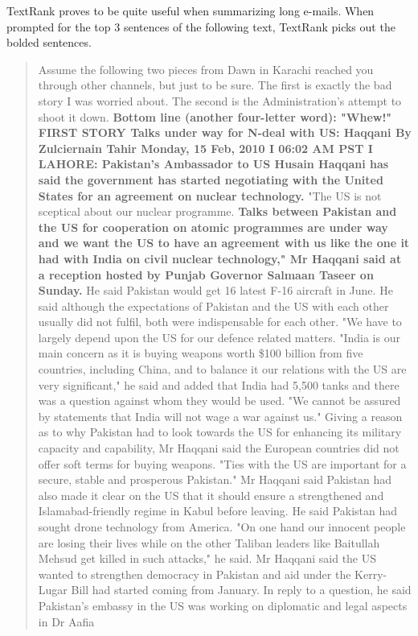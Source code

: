 TextRank proves to be quite useful when summarizing long e-mails.
When prompted for the top 3 sentences of the following text, TextRank picks out the bolded sentences.

\begin{quotation}
Assume the following two pieces from Dawn in Karachi reached you through other channels, but just to be sure.
The first is exactly the bad story I was worried about.
The second is the Administration's attempt to shoot it down.
\textbf{Bottom line (another four-letter word): "Whew!"
FIRST STORY
Talks under way for N-deal with US: Haqqani
By Zulciernain Tahir
Monday, 15 Feb, 2010 I 06:02 AM PST I
LAHORE: Pakistan's Ambassador to US Husain Haqqani has said the government has started negotiating with the United
States for an agreement on nuclear technology.}
"The US is not sceptical about our nuclear programme. \textbf{Talks between Pakistan and the US for cooperation on atomic
programmes are under way and we want the US to have an agreement with us like the one it had with India on civil
nuclear technology," Mr Haqqani said at a reception hosted by Punjab Governor Salmaan Taseer on Sunday.}
He said Pakistan would get 16 latest F-16 aircraft in June. He said although the expectations of Pakistan and the US with
each other usually did not fulfil, both were indispensable for each other.
"We have to largely depend upon the US for our defence related matters.
"India is our main concern as it is buying weapons worth \$100 billion from five countries, including China, and to balance
it our relations with the US are very significant," he said and added that India had 5,500 tanks and there was a question
against whom they would be used. "We cannot be assured by statements that India will not wage a war against us."
Giving a reason as to why Pakistan had to look towards the US for enhancing its military capacity and capability, Mr
Haqqani said the European countries did not offer soft terms for buying weapons. "Ties with the US are important for a
secure, stable and prosperous Pakistan."
Mr Haqqani said Pakistan had also made it clear on the US that it should ensure a strengthened and Islamabad-friendly
regime in Kabul before leaving.
He said Pakistan had sought drone technology from America. "On one hand our innocent people are losing their lives
while on the other Taliban leaders like Baitullah Mehsud get killed in such attacks," he said.
Mr Haqqani said the US wanted to strengthen democracy in Pakistan and aid under the Kerry-Lugar Bill had started
coming from January.
In reply to a question, he said Pakistan's embassy in the US was working on diplomatic and legal aspects in Dr Aafia

\end{quotation}
